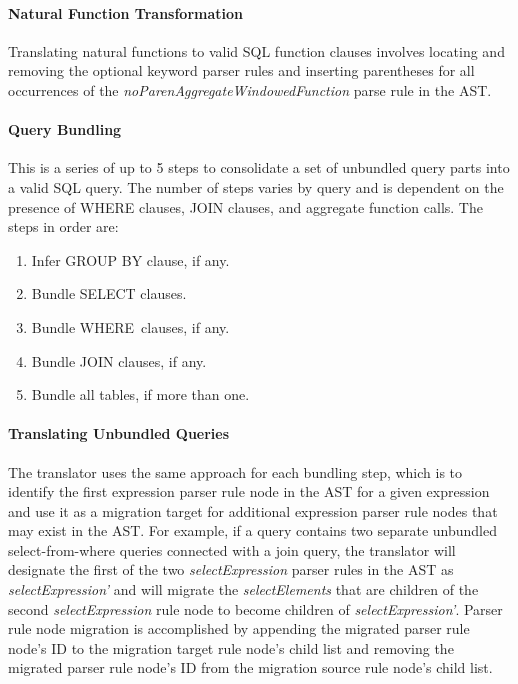 \ReorderParseTreeAlgorithm
\ReorderModifiersAlgorithm

\paragraph{\textbf{Natural Function Transformation}}
Translating natural functions to valid SQL function clauses involves locating and removing the optional keyword parser rules and inserting parentheses for all occurrences of the \emph{noParenAggregateWindowedFunction} parse rule in the AST.

\TransformNaturalFunctions

\paragraph{\textbf{Query Bundling}}
This is a series of up to 5 steps to consolidate a set of unbundled query parts into a valid SQL query. 
The number of steps varies by query and is dependent on the presence of WHERE clauses, JOIN clauses, and aggregate function calls. 
The steps in order are:

\begin{enumerate}
\item Infer GROUP BY clause, if any.

\item Bundle SELECT clauses. 

\item Bundle WHERE clauses, if any.

\item Bundle JOIN clauses, if any.

\item Bundle all tables, if more than one.

\end{enumerate}


\paragraph{Translating Unbundled Queries}

The translator uses the same approach for each bundling step, which is to identify the first expression parser rule node in the AST for a given expression and use it as a migration target for additional expression parser rule nodes that may exist in the AST. For example, if a query contains two separate unbundled select-from-where queries connected with a join query, the translator will designate the first of the two \emph{selectExpression} parser rules in the AST as \emph{selectExpression'} and will migrate the \emph{selectElements} that are children of the second \emph{selectExpression} rule node to become children of \emph{selectExpression'}. 
Parser rule node migration is accomplished by appending the migrated parser rule node's ID to the migration target rule node's child list and removing the migrated parser rule node's ID from the migration source rule node's child list.

